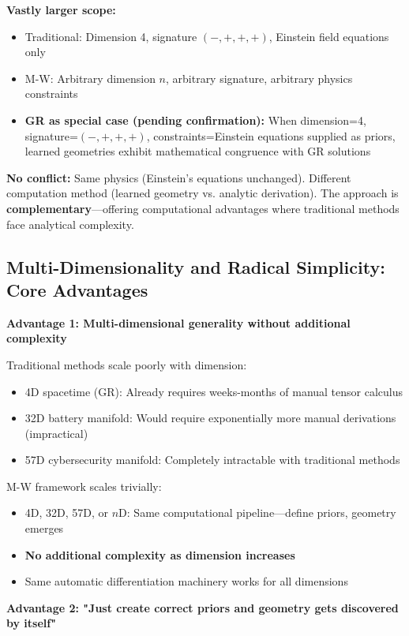 \documentclass[11pt,a4paper]{article}
\begin{document}
\textbf{Vastly larger scope:} 
\begin{itemize}
\item Traditional: Dimension 4, signature $(-,+,+,+)$, Einstein field equations only
\item M-W: Arbitrary dimension $n$, arbitrary signature, arbitrary physics constraints
\item \textbf{GR as special case (pending confirmation):} When dimension=4, signature=$(-,+,+,+)$, constraints=Einstein equations supplied as priors, learned geometries exhibit mathematical congruence with GR solutions
\end{itemize}

\textbf{No conflict:} Same physics (Einstein's equations unchanged). Different computation method (learned geometry vs. analytic derivation). The approach is \textbf{complementary}—offering computational advantages where traditional methods face analytical complexity.

\subsection{Multi-Dimensionality and Radical Simplicity: Core Advantages}

\textbf{Advantage 1: Multi-dimensional generality without additional complexity}

Traditional methods scale poorly with dimension:
\begin{itemize}
\item 4D spacetime (GR): Already requires weeks-months of manual tensor calculus
\item 32D battery manifold: Would require exponentially more manual derivations (impractical)
\item 57D cybersecurity manifold: Completely intractable with traditional methods
\end{itemize}

M-W framework scales trivially:
\begin{itemize}
\item 4D, 32D, 57D, or $n$D: Same computational pipeline—define priors, geometry emerges
\item \textbf{No additional complexity as dimension increases}
\item Same automatic differentiation machinery works for all dimensions
\end{itemize}

\textbf{Advantage 2: "Just create correct priors and geometry gets discovered by itself"}
\end{document}
